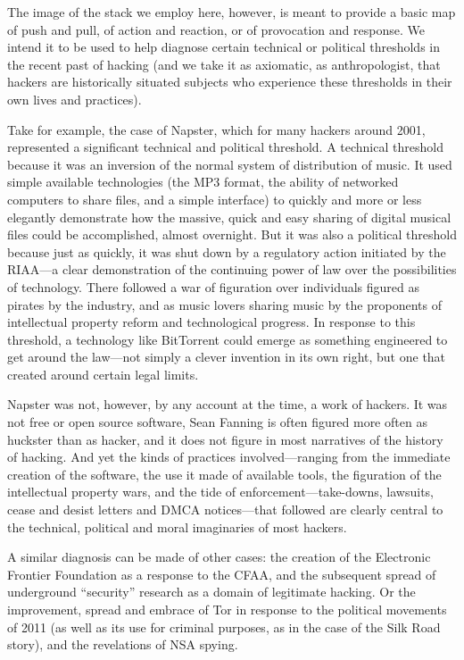 \documentclass[10pt,letter,oneside]{scrartcl}
\begin{document}
The image of the stack we employ here, however, is meant to provide a basic map
of push and pull, of action and reaction, or of provocation and response.  We
intend it to be used to help diagnose certain technical or political thresholds
in the recent past of hacking (and we take it as axiomatic, as anthropologist, that
hackers are historically situated subjects who experience these thresholds in
their own lives and practices).   

Take for example, the case of Napster, which for many hackers around 2001,
represented a significant technical and political threshold.  A technical
threshold because it was an inversion of the normal system of distribution of music.
It used simple available technologies (the MP3 format, the ability of networked
computers to share files, and a simple interface) to quickly and more or less
elegantly demonstrate how the massive, quick and easy sharing of digital musical
files could be accomplished, almost overnight.  But it was also a political
threshold because just as quickly, it was shut down by a regulatory action
initiated by the RIAA---a clear demonstration of the continuing power of law
over the possibilities of technology.  There followed a war of figuration over
individuals figured as pirates by the industry, and as music lovers sharing
music by the proponents of intellectual property reform and technological
progress.  In response to this threshold, a technology like BitTorrent could
emerge as something engineered to get around the law---not simply a clever
invention in its own right, but one that created around certain legal limits. 

Napster was not, however, by any account at the time, a work of hackers.  It was
not free or open source software, Sean Fanning is often figured more often as
huckster than as hacker, and it does not figure in most narratives of the
history of hacking.  And yet the kinds of practices involved---ranging from the
immediate creation of the software, the use it made of available tools, the
figuration of the intellectual property wars, and the tide of
enforcement---take-downs, lawsuits, cease and desist letters and DMCA
notices---that followed are clearly central to the technical, political and
moral imaginaries of most hackers.

A similar diagnosis can be made of other cases: the creation of the Electronic
Frontier Foundation as a response to the CFAA, and the subsequent spread of
underground ``security'' research as a domain of legitimate hacking.  Or the
improvement, spread and embrace of Tor in response to the political movements of
2011 (as well as its use for criminal purposes, as in the case of the Silk Road
story), and the revelations of NSA spying. 
\end{document}
